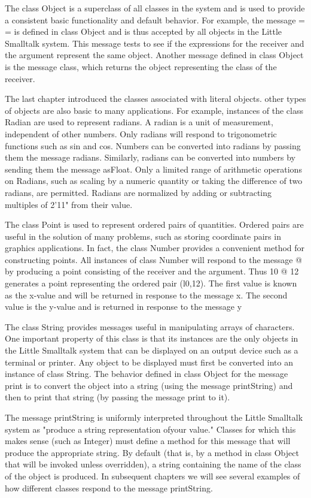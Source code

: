 
The class Object is a superclass of all classes in the system and is used to
provide a consistent basic functionality and default behavior. For example,
the message = = is defined in class Object and is thus accepted by all
objects in the Little Smalltalk system. This message tests to see if the
expressions for the receiver and the argument represent the same object.
Another message defined in class Object is the message class, which returns the object representing the class of the receiver.

The last chapter introduced the classes associated with literal objects.
other types of objects are also basic to many applications. For example,
instances of the class Radian are used to represent radians. A radian is a
unit of measurement, independent of other numbers. Only radians will
respond to trigonometric functions such as sin and cos. Numbers can be
converted into radians by passing them the message radians. Similarly,
radians can be converted into numbers by sending them the message
asFloat. Only a limited range of arithmetic operations on Radians, such
as scaling by a numeric quantity or taking the difference of two radians,
are permitted. Radians are normalized by adding or subtracting multiples
of 2'11" from their value.

The class Point is used to represent ordered pairs of quantities. Ordered pairs are useful in the solution of many problems, such as storing
coordinate pairs in graphics applications. In fact, the class Number provides a convenient method for constructing points. All instances of class
Number will respond to the message @ by producing a point consisting
of the receiver and the argument. Thus 10 @ 12 generates a point representing the ordered pair (l0,12). The first value is known as the x-value
and will be returned in response to the message x. The second value is the
y-value and is returned in response to the message y

The class String provides messages useful in manipulating arrays of
characters. One important property of this class is that its instances are
the only objects in the Little Smalltalk system that can be displayed on an
output device such as a terminal or printer. Any object to be displayed
must first be converted into an instance of class String. The behavior
defined in class Object for the message print is to convert the object into
a string (using the message printString) and then to print that string (by
passing the message print to it).

The message printString is uniformly interpreted throughout the Little
Smalltalk system as "produce a string representation ofyour value." Classes
for which this makes sense (such as Integer) must define a method for
this message that will produce the appropriate string. By default (that is,
by a method in class Object that will be invoked unless overridden), a
string containing the name of the class of the object is produced. In subsequent chapters we will see several examples of how different classes
respond to the message printString.

